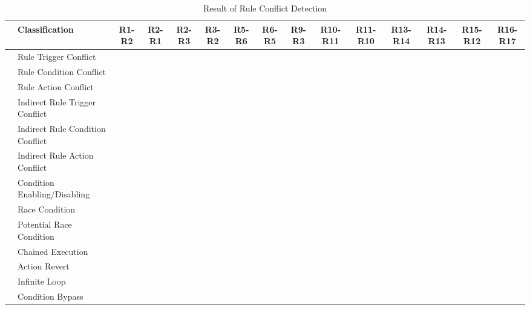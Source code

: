 \begin{table}[htbp]
	\centering
	\caption{Result of Rule Conflict Detection}
	\label{conflict_detection_result}
	\begin{adjustbox}{width=\textwidth}
		\begin{tabular}{|c|l|c|c|c|c|c|c|c|c|c|c|c|c|c|} 
			\hline
			& \textbf{Classification} & \textbf{R1-R2} & \textbf{R2-R1} & \textbf{R2-R3} & \textbf{R3-R2} & \textbf{R5-R6} & \textbf{R6-R5} & \textbf{R9-R3} & \textbf{R10-R11} & \textbf{R11-R10} & \textbf{R13-R14} & \textbf{R14-R13} & \textbf{R15-R12} & \textbf{R16-R17} \\ \hline
			\multirow{6}{*}{\rotatebox{90}{Ours}} & Rule Trigger Conflict &  &  &  &  &  &  &  &  &  &  &  &  &  \\
			\cline{2-15}
			& Rule Condition Conflict &  &  &  &  &  &  &  &  &  &  &  &  &  \\
			\cline{2-15}
			& Rule Action Conflict &  &  &  &  &  &  &  &  &  & \checkmark & \checkmark &  &  \\
			\cline{2-15}
			& Indirect Rule Trigger Conflict &  &  &  &  &  &  &  &  & \checkmark & \checkmark &  &  &  \\
			\cline{2-15}
			& Indirect Rule Condition Conflict &  &  &  &  &  &  &  &  &  &  &  &  &  \\
			\cline{2-15}
			& Indirect Rule Action Conflict &  &  &  &  &  &  &  & \checkmark & \checkmark &  &  &  &  \\
			\hline
			
			\multirow{7}{*}{\rotatebox{90}{IoTMediator}}
			& Condition Enabling/Disabling &  &  &  &  & \checkmark & \checkmark & \checkmark &  &  &  &  & \checkmark &  \\
			\cline{2-15}
			& Race Condition &  &  &  &  &  &  &  &  &  &  &  &  &  \\
			\cline{2-15}
			& Potential Race Condition & \checkmark & \checkmark & \checkmark & \checkmark & \checkmark & \checkmark &  &  &  & \checkmark &  &  & \checkmark \\
			\cline{2-15}
			& Chained Execution &  &  &  &  &  &  &  &  &  &  &  &  &  \\
			\cline{2-15}
			& Action Revert &  &  &  &  &  &  &  &  &  &  &  &  &  \\
			\cline{2-15}
			& Infinite Loop &  &  &  &  &  &  &  &  &  &  &  &  &  \\
			\cline{2-15}
			& Condition Bypass &  &  &  &  &  &  &  &  &  &  &  &  &  \\ \hline
		\end{tabular}
	\end{adjustbox}
\end{table}

